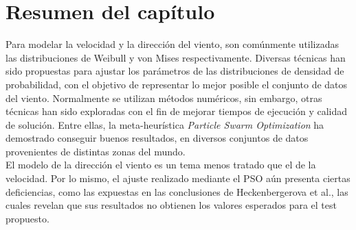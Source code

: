 \section{Resumen del capítulo}
Para modelar la velocidad y la dirección del viento, son comúnmente utilizadas las distribuciones de Weibull y von Mises respectivamente. Diversas técnicas han sido propuestas para ajustar los parámetros de las distribuciones de densidad de probabilidad, con el objetivo de representar lo mejor posible el conjunto de datos del viento. Normalmente se utilizan métodos numéricos, sin embargo, otras técnicas han sido exploradas con el fin de mejorar tiempos de ejecución y calidad de solución. Entre ellas, la meta-heurística \emph{Particle Swarm Optimization} ha demostrado conseguir buenos resultados, en diversos conjuntos de datos provenientes de distintas zonas del mundo.\\
El modelo de la dirección el viento es un tema menos tratado que el de la velocidad. Por lo mismo, el ajuste realizado mediante el PSO aún presenta ciertas deficiencias, como las expuestas en las conclusiones de Heckenbergerova et al.\cite{Heckenbergerova15}, las cuales revelan que sus resultados no obtienen los valores esperados para el test propuesto.\\